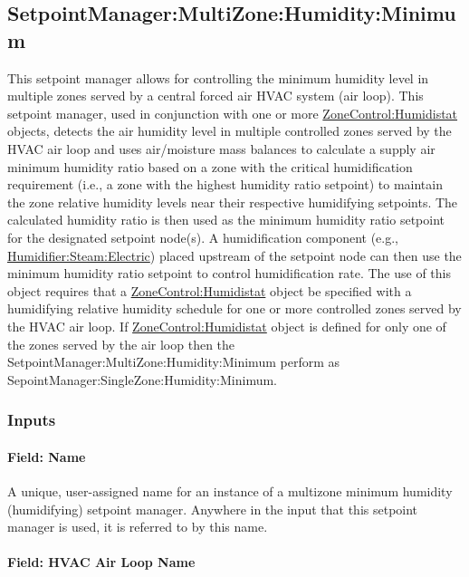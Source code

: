 \subsection{SetpointManager:MultiZone:Humidity:Minimum}\label{setpointmanagermultizonehumidityminimum}

This setpoint manager allows for controlling the minimum humidity level in multiple zones served by a central forced air HVAC system (air loop). This setpoint manager, used in conjunction with one or more \hyperref[zonecontrolhumidistat]{ZoneControl:Humidistat} objects, detects the air humidity level in multiple controlled zones served by the HVAC air loop and uses air/moisture mass balances to calculate a supply air minimum humidity ratio based on a zone with the critical humidification requirement (i.e., a zone with the highest humidity ratio setpoint) to maintain the zone relative humidity levels near their respective humidifying setpoints. The calculated humidity ratio is then used as the minimum humidity ratio setpoint for the designated setpoint node(s). A humidification component (e.g., \hyperref[humidifiersteamelectric]{Humidifier:Steam:Electric}) placed upstream of the setpoint node can then use the minimum humidity ratio setpoint to control humidification rate. The use of this object requires that a \hyperref[zonecontrolhumidistat]{ZoneControl:Humidistat} object be specified with a humidifying relative humidity schedule for one or more controlled zones served by the HVAC air loop. If \hyperref[zonecontrolhumidistat]{ZoneControl:Humidistat} object is defined for only one of the zones served by the air loop then the SetpointManager:MultiZone:Humidity:Minimum perform as SepointManager:SingleZone:Humidity:Minimum.

\subsubsection{Inputs}\label{inputs-18-007}

\paragraph{Field: Name}\label{field-name-18-006}

A unique, user-assigned name for an instance of a multizone minimum humidity (humidifying) setpoint manager. Anywhere in the input that this setpoint manager is used, it is referred to by this name.

\paragraph{Field: HVAC Air Loop Name}\label{field-hvac-air-loop-name-8}

